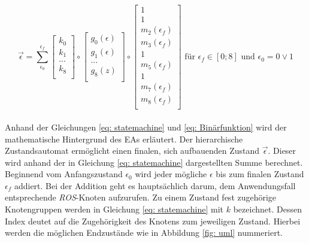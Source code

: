	\begin{equation}
	\vec{\epsilon}=\sum_{\epsilon_0}^{\epsilon_f} \left[ \begin{array}{r}
	k_0  \\
	k_{1}  \\
	...  \\
	k_8  \\
	\end{array}\right] \circ
	\left[ \begin{array}{r}
	g_0(\epsilon)  \\
	g_{1}(\epsilon)  \\
	...  \\
	g_8(z)  \\
	\end{array}\right]  \circ
	\left[ \begin{array}{r}
	1  \\
	1  \\
	m_{2}(\epsilon_f)  \\
	m_{3}(\epsilon_f)   \\
	1  \\
	m_{5}(\epsilon_f)  \\
	1   \\
	m_{7}(\epsilon_f)   \\
	m_8(\epsilon_f)  \\
	\end{array}\right]
	\text{ für }\epsilon_f\in[0;8] \text{ und }\epsilon_0=0 \vee 1
	\label{eq: statemachine}
	\end{equation}\\
	
		Anhand der Gleichungen \ref{eq: statemachine} und \ref{eq: Binärfunktion} wird der mathematische Hintergrund des EAs erläutert. Der hierarchische Zustandsautomat ermöglicht einen finalen, sich aufbauenden Zustand $\vec{\epsilon}$. Dieser wird anhand der in Gleichung \ref{eq: statemachine} dargestellten Summe berechnet. Beginnend vom Anfangszustand $\epsilon_0$ wird jeder mögliche $\epsilon$ bis zum finalen Zustand $\epsilon_f$ addiert. Bei der Addition geht es hauptsächlich darum, dem Anwendungsfall entsprechende \textit{ROS}-Knoten aufzurufen. Zu einem Zustand fest zugehörige Knotengruppen werden in Gleichung \ref{eq: statemachine} mit $k$ bezeichnet. Dessen Index deutet auf die Zugehörigkeit des Knotens zum jeweiligen Zustand. Hierbei werden die möglichen Endzustände wie in Abbildung \ref{fig: uml} nummeriert.\\
		
